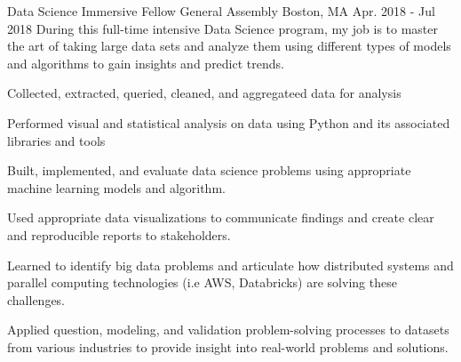 

\begin{cventries}

  \cventry
    {Data Science Immersive Fellow} %
    {General Assembly} %
    {Boston, MA} %
    {Apr. 2018 - Jul 2018} %
    {During this full-time intensive Data Science program, my job is to master the art of taking large data sets and analyze them using different types of models and algorithms to gain insights and predict trends.}
    {
      \begin{cvitems} %
        \item {Collected, extracted, queried, cleaned, and aggregateed data for analysis}
        \item {Performed visual and statistical analysis on data using Python and its associated libraries and tools}
        \item {Built, implemented, and evaluate data science problems using appropriate machine learning models and algorithm.}
        \item {Used appropriate data visualizations to communicate findings and create clear and reproducible reports to stakeholders.}
        \item {Learned to identify big data problems and articulate how distributed systems and parallel computing technologies (i.e AWS, Databricks) are solving these challenges.}
        \item {Applied question, modeling, and validation problem-solving processes to datasets from various industries to provide insight into real-world problems and solutions.}
      \end{cvitems}
    }


\end{cventries}
